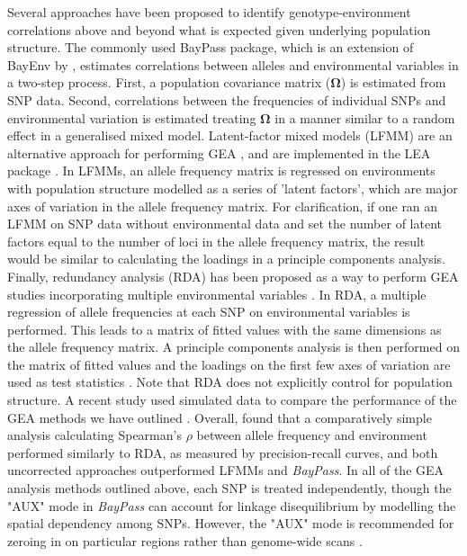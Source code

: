 \documentclass[10pt,twoside,lineno, twocolumn]{GSA_format}
\begin{document}
Several approaches have been proposed to identify genotype-environment correlations above and beyond what is expected given underlying population structure. The commonly used BayPass \citep{Gautier2015} package, which is an extension of BayEnv by \cite{Coop2010}, estimates correlations between alleles and environmental variables in a two-step process. First, a population covariance matrix (\textbf{$\mathbf{\Omega}$}) is estimated from SNP data. Second, correlations between the frequencies of individual SNPs and environmental variation is estimated treating \textbf{$\mathbf{\Omega}$} in a manner similar to a random effect in a generalised mixed model. Latent-factor mixed models (LFMM) are an alternative approach for performing GEA \citep{Frichot2013}, and are implemented in the LEA package \citep{Frichot2015}. In LFMMs, an allele frequency matrix is regressed on environments with population structure modelled as a series of 'latent factors', which are major axes of variation in the allele frequency matrix. For clarification, if one ran an LFMM on SNP data without environmental data and set the number of latent factors equal to the number of loci in the allele frequency matrix, the result would be similar to calculating the loadings in a principle components analysis. Finally, redundancy analysis (RDA) has been proposed as a way to perform GEA studies incorporating multiple environmental variables \citep{Forester2016, Forester2018}. In RDA, a multiple regression of allele frequencies at each SNP on environmental variables is performed. This leads to a matrix of fitted values with the same dimensions as the allele frequency matrix. A principle components analysis is then performed on the matrix of fitted values and the loadings on the first few axes of variation are used as test statistics \citep{Legendre2012}. Note that RDA does not explicitly control for population structure. A recent study used simulated data to compare the performance of the GEA methods we have outlined \citep{Lotterhos2019-ki}. Overall, \cite{Lotterhos2019-ki} found that a comparatively simple analysis calculating Spearman's $\rho$ between allele frequency and environment performed similarly to RDA, as measured by precision-recall curves, and both uncorrected approaches outperformed LFMMs and \textit{BayPass}. In all of the GEA analysis methods outlined above, each SNP is treated independently, though the "AUX" mode in \textit{BayPass} can account for linkage disequilibrium by modelling the spatial dependency among SNPs. However, the "AUX" mode is recommended for zeroing in on particular regions rather than genome-wide scans \citep{Gautier2015}.\\
\end{document}
